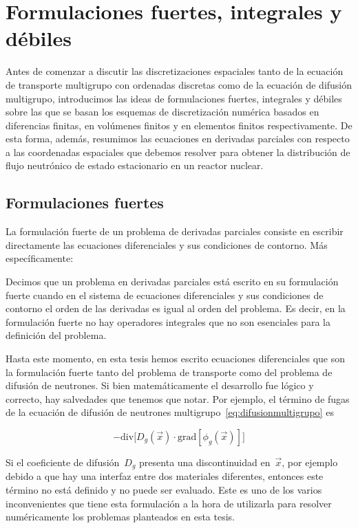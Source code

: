 \section{Formulaciones fuertes, integrales y débiles} %

Antes de comenzar a discutir las discretizaciones espaciales tanto de la ecuación de transporte multigrupo con ordenadas discretas como de la ecuación de difusión multigrupo, introducimos las ideas de formulaciones fuertes, integrales y débiles sobre las que se basan los esquemas de discretización numérica basados en diferencias finitas, en volúmenes finitos y en elementos finitos respectivamente. De esta forma, además, resumimos las ecuaciones en derivadas parciales con respecto a las coordenadas espaciales que debemos resolver para obtener la distribución de flujo neutrónico de estado estacionario en un reactor nuclear.

\subsection{Formulaciones fuertes} %
\label{sec:fuertes}

La formulación fuerte de un problema de derivadas parciales consiste en escribir directamente las ecuaciones diferenciales y sus condiciones de contorno. Más específicamente:

\begin{definicion}
 Decimos que un problema en derivadas parciales está escrito en su formulación fuerte cuando en el sistema de ecuaciones diferenciales y sus condiciones de contorno el orden de las derivadas es igual al orden del problema. Es decir, en la formulación fuerte no hay operadores integrales que no son esenciales para la definición del problema.
\end{definicion}

Hasta este momento, en esta tesis hemos escrito ecuaciones diferenciales que son la formulación fuerte tanto del problema de transporte como del problema de difusión de neutrones. Si bien matemáticamente el desarrollo fue lógico y correcto, hay salvedades que tenemos que notar. Por ejemplo, el término de fugas de la ecuación de difusión de neutrones multigrupo~\eqref{eq:difusionmultigrupo} es

\begin{equation*}
 - \text{div} \Big[ D_g(\vec{x}) \cdot \text{grad} \left[ \phi_g(\vec{x}) \right] \Big]
\end{equation*}

Si el coeficiente de difusión~$D_g$ presenta una discontinuidad en~$\vec{x}$, por ejemplo debido a que hay una interfaz entre dos materiales diferentes, entonces este término no está definido y no puede ser evaluado. Este es uno de los varios inconvenientes que tiene esta formulación a la hora de utilizarla para resolver numéricamente los problemas planteados en esta tesis. 


